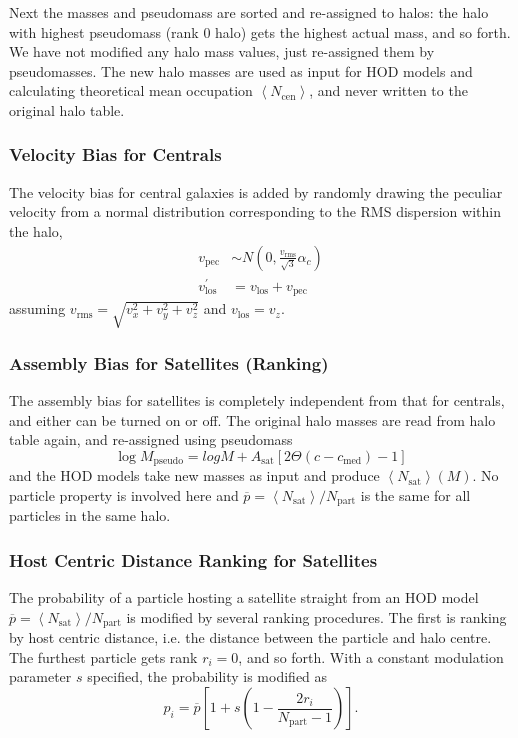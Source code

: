 \documentclass[10pt,A4]{aastex62}
\begin{document}
			Next the masses and pseudomass are sorted and re-assigned to halos: the halo with highest pseudomass (rank 0 halo) gets the highest actual mass, and so forth. We have not modified any halo mass values, just re-assigned them by pseudomasses. The new halo masses are used as input for HOD models and calculating theoretical mean occupation $\left<N_\text{cen}\right>$, and never written to the original halo table.
			
		\subsubsection{Velocity Bias for Centrals}
		
			The velocity bias for central galaxies is added by randomly drawing the peculiar velocity from a normal distribution corresponding to the RMS dispersion within the halo,
			\begin{align}
				v_\text{pec} &\sim N(0, \frac{v_\text{rms}}{\sqrt{3}} \alpha_c) \\
				v_\text{los} ^\prime &= v_\text{los} + v_\text{pec}
			\end{align}
			assuming $v_\text{rms} = \sqrt{v_x^2 + v_y^2 + v_z^2}$ and $v_\text{los} = v_z$.
			
		\subsubsection{Assembly Bias for Satellites (Ranking)}
			
			The assembly bias for satellites is completely independent from that for centrals, and either can be turned on or off. The original halo masses are read from halo table again, and re-assigned using pseudomass
			\begin{equation}
				\log M_\text{pseudo} = log M + A_\text{sat} \left[ 2 \Theta(c-c_\text{med}) - 1 \right]
			\end{equation}
			and the HOD models take new masses as input and produce $\left<N_\text{sat}\right>(M)$. No particle property is involved here and $\overline{p} = \left< N_\text{sat} \right> / N_\text{part}$ is the same for all particles in the same halo.
			
		\subsubsection{Host Centric Distance Ranking for Satellites}
			
			The probability of a particle hosting a satellite straight from an HOD model $\overline{p} = \left<N_\text{sat}\right> / N_\text{part}$ is modified by several ranking procedures. The first is ranking by host centric distance, i.e. the distance between the particle and halo centre. The furthest particle gets rank $r_i=0$, and so forth. With a constant modulation parameter $s$ specified, the probability is modified as
			\begin{equation}
				p_i = \overline{p} \left[ 1 + s (1 - \frac{2 r_i}{N_\text{part} - 1}) \right] .
			\end{equation}
			
\end{document}
